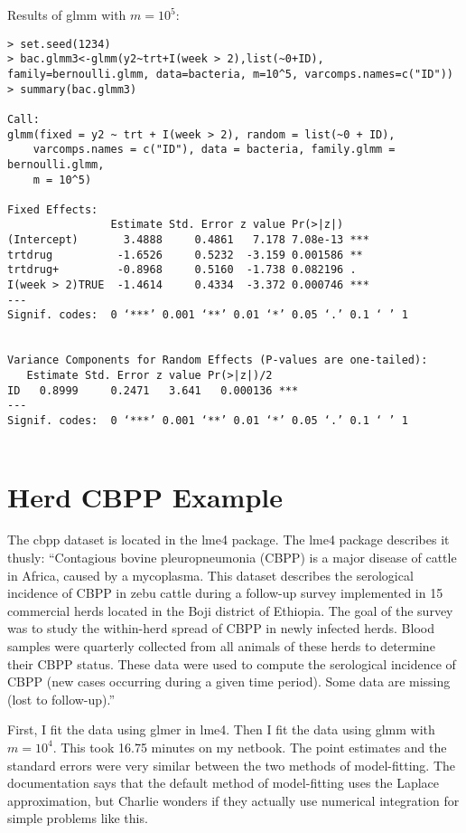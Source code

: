 \documentclass{article}
\begin{document}
Results  of glmm with $m=10^5$:
\begin{verbatim}
> set.seed(1234)
> bac.glmm3<-glmm(y2~trt+I(week > 2),list(~0+ID), family=bernoulli.glmm, data=bacteria, m=10^5, varcomps.names=c("ID"))
> summary(bac.glmm3)

Call:
glmm(fixed = y2 ~ trt + I(week > 2), random = list(~0 + ID), 
    varcomps.names = c("ID"), data = bacteria, family.glmm = bernoulli.glmm, 
    m = 10^5)

Fixed Effects:
                Estimate Std. Error z value Pr(>|z|)    
(Intercept)       3.4888     0.4861   7.178 7.08e-13 ***
trtdrug          -1.6526     0.5232  -3.159 0.001586 ** 
trtdrug+         -0.8968     0.5160  -1.738 0.082196 .  
I(week > 2)TRUE  -1.4614     0.4334  -3.372 0.000746 ***
---
Signif. codes:  0 ‘***’ 0.001 ‘**’ 0.01 ‘*’ 0.05 ‘.’ 0.1 ‘ ’ 1


Variance Components for Random Effects (P-values are one-tailed):
   Estimate Std. Error z value Pr(>|z|)/2    
ID   0.8999     0.2471   3.641   0.000136 ***
---
Signif. codes:  0 ‘***’ 0.001 ‘**’ 0.01 ‘*’ 0.05 ‘.’ 0.1 ‘ ’ 1


\end{verbatim}

\section{Herd CBPP Example}
The cbpp dataset is located in the lme4 package. The lme4 package describes it thusly: ``Contagious bovine pleuropneumonia (CBPP) is a major disease of cattle in Africa, caused by a
mycoplasma. This dataset describes the serological incidence of CBPP in zebu cattle during a
follow-up survey implemented in 15 commercial herds located in the Boji district of Ethiopia. The
goal of the survey was to study the within-herd spread of CBPP in newly infected herds. Blood
samples were quarterly collected from all animals of these herds to determine their CBPP status.
These data were used to compute the serological incidence of CBPP (new cases occurring during a given time period). Some data are missing (lost to follow-up).''

First, I fit the data using glmer in lme4. Then I fit the data using glmm with $m=10^4$. This took 16.75 minutes on my netbook. The point estimates and the standard errors were very similar between the two  methods of model-fitting. The documentation says that the default method of model-fitting uses the Laplace approximation, but Charlie wonders if they actually use numerical integration for simple problems like this. 
\end{document}
